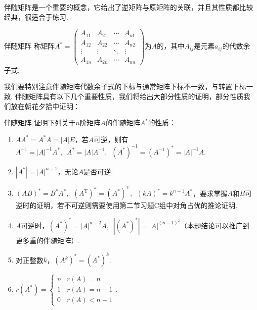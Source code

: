 伴随矩阵是一个重要的概念，它给出了逆矩阵与原矩阵的关联，并且其性质都比较经典，很适合于练习.
\begin{definition}{伴随矩阵}{} 
    称矩阵$A^*=\begin{pmatrix}
            A_{11} & A_{21} & \cdots & A_{n1} \\
            A_{12} & A_{22} & \cdots & A_{n2} \\
            \vdots & \vdots & \ddots & \vdots \\
            A_{1n} & A_{2n} & \cdots & A_{nn}
        \end{pmatrix}$为$A$的，其中$A_{ij}$是元素$a_{ij}$的代数余子式.
\end{definition}
我们要特别注意伴随矩阵代数余子式的下标与通常矩阵下标不一致，与转置下标一致. 伴随矩阵具有以下几个重要性质，我们将给出大部分性质的证明，部分性质我们放在朝花夕拾中证明：
\begin{example}{}{伴随矩阵}
    证明下列关于$n$阶矩阵$A$的伴随矩阵$A^*$的性质：
    \begin{enumerate}
        \item \label{item:13:伴随矩阵:1}
              $AA^*=A^*A=|A|E$，若$A$可逆，则有$A^{-1}=|A|^{-1}A^*,\enspace A^*=|A|A^{-1},\enspace (A^*)^{-1}=(A^{-1})^*=|A|^{-1}A$.

        \item $|A^*|=|A|^{n-1}$，无论$A$是否可逆.

        \item \label{item:13:伴随矩阵:3}
              $(AB)^*=B^*A^*,\enspace (A^\mathrm{T})^*=(A^*)^\mathrm{T},\enspace (kA)^*=k^{n-1}A^*$，要求掌握$A$和$B$可逆时的证明，若不可逆则需要使用第二节习题C组中对角占优的推论证明.

        \item $A$可逆时，$(A^*)^*=|A|^{n-2}A,\enspace |(A^*)^*|=|A|^{(n-1)^2}$（本题结论可以推广到更多重的伴随矩阵）.

        \item 对正整数$k$，$(A^k)^*=(A^*)^k$.

        \item $r(A^*)=\begin{cases}
                      n & r(A)=n     \\
                      1 & r(A)=n-1   \\
                      0 & r(A) < n-1
                  \end{cases}$.
    \end{enumerate}
\end{example}

